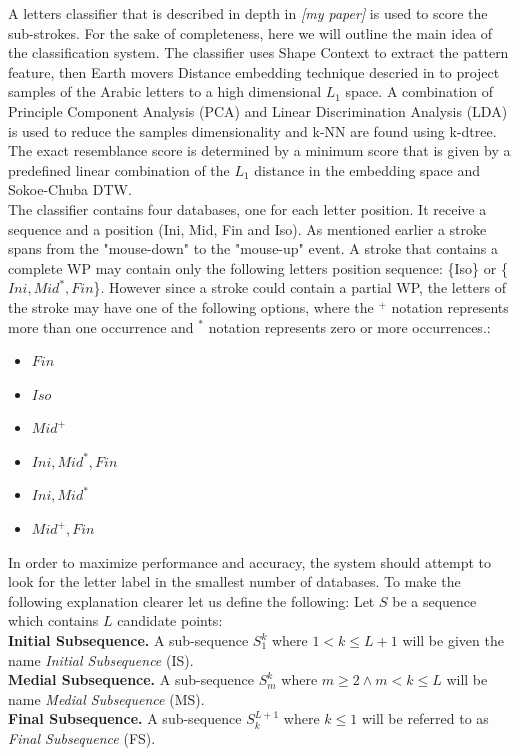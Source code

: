 \documentclass[journal,compsoc]{IEEEtran}
\begin{document}
A letters classifier that is described in depth in \emph{[my paper]} is used to score the sub-strokes. For the sake of completeness, here we will outline the main idea of the classification system. The classifier uses Shape Context to extract the pattern feature, then Earth movers Distance embedding technique descried in \cite{shirdhonkar2008approximate} to project samples of the Arabic letters to a high dimensional $L_{1}$ space. A combination of Principle Component Analysis (PCA) and Linear Discrimination Analysis (LDA) is used to reduce the samples dimensionality and k-NN are found using k-dtree. The exact resemblance score is determined by a minimum score that is given by a predefined linear combination of the $L_{1}$ distance in the embedding space and Sokoe-Chuba DTW.\\

The classifier contains four databases, one for each letter position. It receive a sequence and a position (Ini, Mid, Fin and Iso).
As mentioned earlier a stroke spans from the "mouse-down" to the "mouse-up" event. A stroke that contains a complete WP may contain only the following letters position sequence: \{Iso\} or \{$Ini,Mid^{*},Fin$\}.
However since a stroke could contain a partial WP, the letters of the stroke may have one of the following options, where the  $^{+}$ notation represents more than one occurrence and $^{*}$ notation represents zero or more occurrences.:
\begin{multicols}{2}
\begin{itemize}
    \item $Fin$
    \item $Iso$
    \item $Mid^{+}$
    \item $Ini,Mid^{*},Fin$
    \item $Ini,Mid^{*}$
    \item $Mid^{+},Fin$
\end{itemize}
\end{multicols}
 
In order to maximize performance and accuracy, the system should attempt to look for the letter label in the smallest number of databases. 
To make the following explanation clearer let us define the following: 
Let $S$ be a sequence which contains $L$ candidate points:\\
\textbf{Initial Subsequence.} A sub-sequence $S_1^k$ where $ 1< k \leq L+1$ will be given the name \emph{Initial Subsequence} (IS).\\
\textbf{Medial Subsequence.} A sub-sequence $S_m^k$ where $m \geq 2 \wedge m< k \leq L$ will be name \emph{Medial Subsequence} (MS).\\
\textbf{Final Subsequence.} A sub-sequence $S_k^{L+1}$ where $k \leq 1$ will be referred to as \emph{Final Subsequence} (FS).\\
\end{document}
